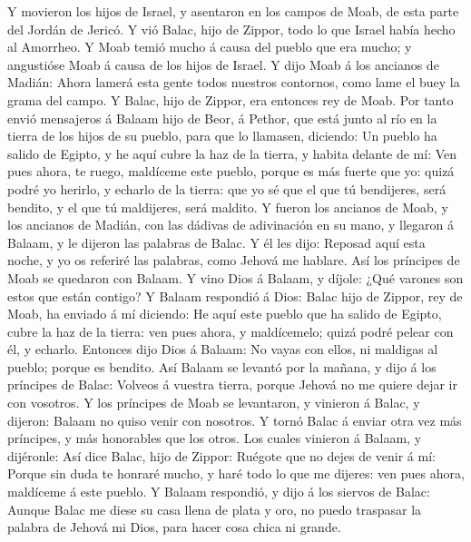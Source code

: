  Y movieron los hijos de Israel, y asentaron en los campos
de Moab, de esta parte del Jordán de Jericó.  Y vió Balac,
hijo de Zippor, todo lo que Israel había hecho al Amorrheo.
 Y Moab temió mucho á causa del pueblo que era mucho; y
angustióse Moab á causa de los hijos de Israel.  Y dijo
Moab á los ancianos de Madián: Ahora lamerá esta gente todos nuestros
contornos, como lame el buey la grama del campo. Y Balac, hijo de
Zippor, era entonces rey de Moab.  Por tanto envió
mensajeros á Balaam hijo de Beor, á Pethor, que está junto al río en la
tierra de los hijos de su pueblo, para que lo llamasen, diciendo: Un
pueblo ha salido de Egipto, y he aquí cubre la haz de la tierra, y
habita delante de mí:  Ven pues ahora, te ruego, maldíceme
este pueblo, porque es más fuerte que yo: quizá podré yo herirlo, y
echarlo de la tierra: que yo sé que el que tú bendijeres, será bendito,
y el que tú maldijeres, será maldito.  Y fueron los
ancianos de Moab, y los ancianos de Madián, con las dádivas de
adivinación en su mano, y llegaron á Balaam, y le dijeron las palabras
de Balac.  Y él les dijo: Reposad aquí esta noche, y yo os
referiré las palabras, como Jehová me hablare. Así los príncipes de Moab
se quedaron con Balaam.  Y vino Dios á Balaam, y díjole:
¿Qué varones son estos que están contigo?  Y Balaam
respondió á Dios: Balac hijo de Zippor, rey de Moab, ha enviado á mí
diciendo:  He aquí este pueblo que ha salido de Egipto,
cubre la haz de la tierra: ven pues ahora, y maldícemelo; quizá podré
pelear con él, y echarlo.  Entonces dijo Dios á Balaam:
No vayas con ellos, ni maldigas al pueblo; porque es bendito.
 Así Balaam se levantó por la mañana, y dijo á los
príncipes de Balac: Volveos á vuestra tierra, porque Jehová no me quiere
dejar ir con vosotros.  Y los príncipes de Moab se
levantaron, y vinieron á Balac, y dijeron: Balaam no quiso venir con
nosotros.  Y tornó Balac á enviar otra vez más príncipes,
y más honorables que los otros.  Los cuales vinieron á
Balaam, y dijéronle: Así dice Balac, hijo de Zippor: Ruégote que no
dejes de venir á mí:  Porque sin duda te honraré mucho, y
haré todo lo que me dijeres: ven pues ahora, maldíceme á este pueblo.
 Y Balaam respondió, y dijo á los siervos de Balac:
Aunque Balac me diese su casa llena de plata y oro, no puedo traspasar
la palabra de Jehová mi Dios, para hacer cosa chica ni grande.
